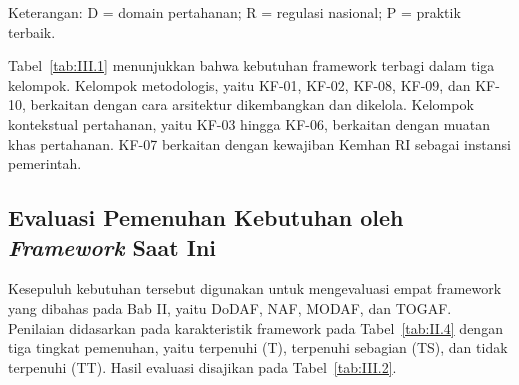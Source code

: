 \endgroup

Keterangan: D = domain pertahanan; R = regulasi nasional; P = praktik terbaik.

Tabel~\ref{tab:III.1} menunjukkan bahwa kebutuhan framework terbagi dalam tiga kelompok. Kelompok metodologis, yaitu KF-01, KF-02, KF-08, KF-09, dan KF-10, berkaitan dengan cara arsitektur dikembangkan dan dikelola. Kelompok kontekstual pertahanan, yaitu KF-03 hingga KF-06, berkaitan dengan muatan khas pertahanan. KF-07 berkaitan dengan kewajiban Kemhan RI sebagai instansi pemerintah.

\subsection{Evaluasi Pemenuhan Kebutuhan oleh \textit{Framework} Saat Ini}
\label{sec:III.1.3}

Kesepuluh kebutuhan tersebut digunakan untuk mengevaluasi empat framework yang dibahas pada Bab II, yaitu DoDAF, NAF, MODAF, dan TOGAF. Penilaian didasarkan pada karakteristik framework pada Tabel~\ref{tab:II.4} dengan tiga tingkat pemenuhan, yaitu terpenuhi (T), terpenuhi sebagian (TS), dan tidak terpenuhi (TT). Hasil evaluasi disajikan pada Tabel~\ref{tab:III.2}.

